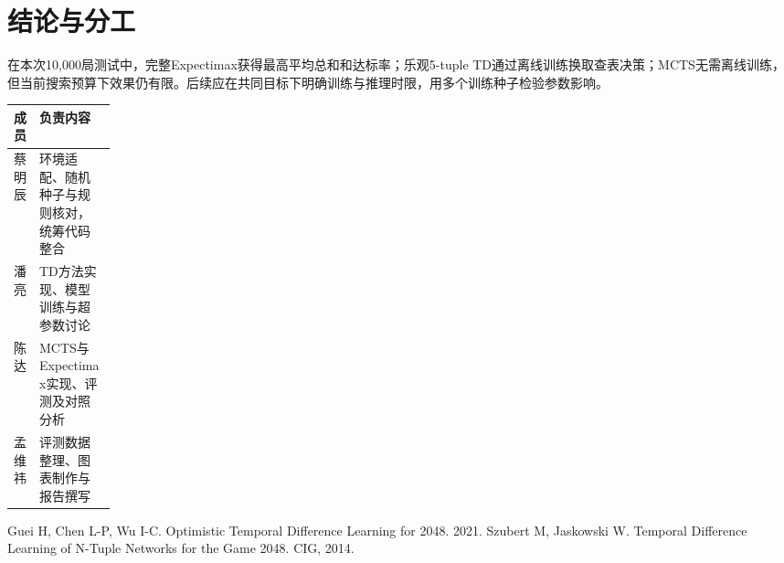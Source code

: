 \documentclass[UTF8,zihao=-4,fontset=none]{ctexart}
\begin{document}
\section{结论与分工}
在本次10,000局测试中，完整Expectimax获得最高平均总和和达标率；乐观5-tuple TD通过离线训练换取查表决策；MCTS无需离线训练，但当前搜索预算下效果仍有限。后续应在共同目标下明确训练与推理时限，用多个训练种子检验参数影响。

\noindent\begin{tabularx}{\linewidth}{@{}p{0.13\linewidth}Y@{}}\toprule 成员&负责内容\\\midrule
蔡明辰&环境适配、随机种子与规则核对，统筹代码整合\\
潘亮&TD方法实现、模型训练与超参数讨论\\
陈达&MCTS与Expectimax实现、评测及对照分析\\
孟维祎&评测数据整理、图表制作与报告撰写\\\bottomrule\end{tabularx}
\begin{thebibliography}{9}\setlength{\itemsep}{2bp}\setlength{\parskip}{0bp}
 Guei H, Chen L-P, Wu I-C. Optimistic Temporal Difference Learning for 2048. 2021.
 Szubert M, Jaskowski W. Temporal Difference Learning of N-Tuple Networks for the Game 2048. CIG, 2014.
\end{thebibliography}
\end{document}
